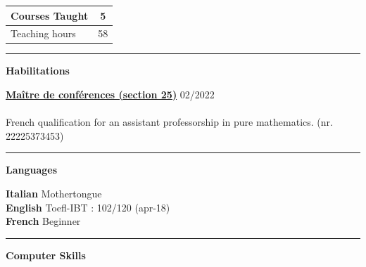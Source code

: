 \documentclass[a4paper]{article}
\newcommand{\block}[1]{\hrule \vspace{0.2cm} \textbf{\Large #1} \vspace{0.2cm}}
\newcommand{\voice}[5]{\href{#4}{\textbf{#1}} \hfill #2 \\ \textit{#3} \\ {\small #5} \vspace{0.2cm} \\}
\newcommand{\skill}[2]{\textbf{#1} \hfill #2 \\}
\begin{document}
\begin{minipage}[t]{0.375\columnwidth}
\begin{tabularx}{\linewidth}{|X|c|}
    Courses Taught & 5 \\
    \hline
    
    Teaching hours & 58 \\
    \hline
    
    \end{tabularx}
    \vspace{1em}





    \block{Habilitations}

    
    \voice{Maître de conférences (section 25)}
        {02/2022}
        {\vspace{-0.5cm}}
        {https://www.galaxie.enseignementsup-recherche.gouv.fr/ensup/qualification/Resultats_2022/qualifies_MCF_2022.pdf}       
        {French qualification for an assistant professorship in pure mathematics.  (nr. 22225373453)}





    \block{Languages} 
    
    
    \skill{Italian}{Mothertongue}
    \skill{English}{Toefl-IBT : 102/120 (apr-18)}
    \skill{French}{Beginner}





    \block{Computer Skills} 
    

\end{minipage}
\end{document}
